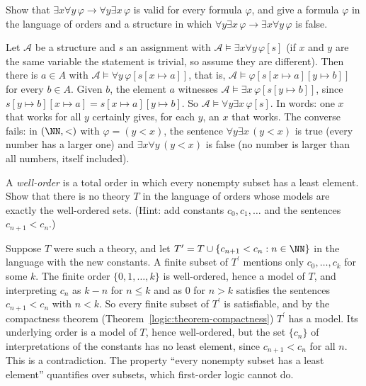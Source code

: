 \begin{exercise}\label{logic:exercise-quantifier-order}
Show that $\exists x \forall y\, \varphi \to \forall y \exists x\, \varphi$ is
valid for every formula $\varphi$, and give a formula $\varphi$ in the language
of orders and a structure in which
$\forall y \exists x\, \varphi \to \exists x \forall y\, \varphi$ is false.
\end{exercise}

\begin{solution}
Let $\mathcal{A}$ be a structure and $s$ an assignment with $\mathcal{A} \models \exists x \forall y\, \varphi[s]$ (if $x$ and $y$ are the same variable the statement is trivial, so assume
they are different). Then there is $a \in A$ with $\mathcal{A} \models \forall y\, \varphi[s[x \mapsto a]]$, that is, $\mathcal{A} \models \varphi[s[x \mapsto a][y \mapsto b]]$ for every $b \in A$.
Given $b$, the element $a$ witnesses $\mathcal{A} \models \exists x\, \varphi[s[y \mapsto b]]$, since $s[y \mapsto b][x \mapsto a] = s[x \mapsto a][y \mapsto b]$. So
$\mathcal{A} \models \forall y \exists x\, \varphi[s]$. In words: one $x$ that works for all $y$ certainly gives, for each $y$, an $x$ that works. The converse fails: in $(\NN, <)$
with $\varphi = (y < x)$, the sentence $\forall y \exists x\,(y < x)$ is true (every number has a larger one) and $\exists x \forall y\,(y < x)$ is false (no number is larger than
all numbers, itself included).
\end{solution}

\begin{exercise}\label{logic:exercise-well-orders}
A \emph{well-order} is a total order in which every nonempty subset has a
least element. Show that there is no theory $T$ in the language of orders
whose models are exactly the well-ordered sets. (Hint: add constants
$c_0, c_1, \ldots$ and the sentences $c_{n+1} < c_n$.)
\end{exercise}

\begin{solution}
Suppose $T$ were such a theory, and let $T^{\prime} = T \cup \{c_{n+1} < c_n : n \in \NN\}$ in the language with the new constants. A finite subset of $T^{\prime}$ mentions only
$c_0, \ldots, c_k$ for some $k$. The finite order $\{0, 1, \ldots, k\}$ is well-ordered, hence a model of $T$, and interpreting $c_n$ as $k - n$ for $n \leq k$ and as $0$ for $n > k$
satisfies the sentences $c_{n+1} < c_n$ with $n < k$. So every finite subset of $T^{\prime}$ is satisfiable, and by the compactness theorem (Theorem~\ref{logic:theorem-compactness}) $T^{\prime}$
has a model. Its underlying order is a model of $T$, hence well-ordered, but the set $\{c_n\}$ of interpretations of the constants has no least element, since $c_{n+1} < c_n$ for
all $n$. This is a contradiction. The property ``every nonempty subset has a least element'' quantifies over subsets, which first-order logic cannot do.
\end{solution}

